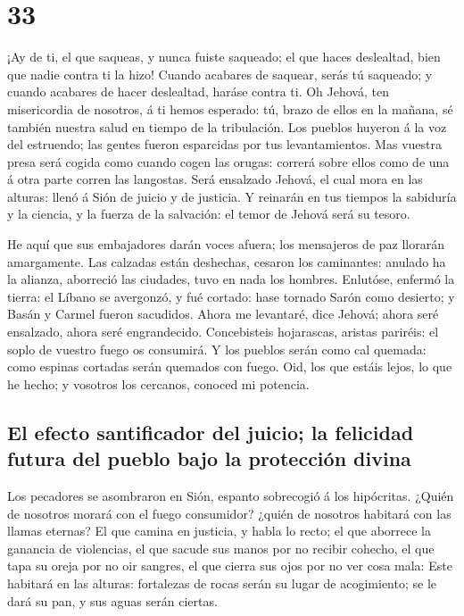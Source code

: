 \hypertarget{section-32}{%
\section{33}\label{section-32}}

 ¡Ay de ti, el que saqueas, y nunca fuiste saqueado; el que
haces deslealtad, bien que nadie contra ti la hizo! Cuando acabares de
saquear, serás tú saqueado; y cuando acabares de hacer deslealtad,
haráse contra ti.  Oh Jehová, ten misericordia de nosotros,
á ti hemos esperado: tú, brazo de ellos en la mañana, sé también nuestra
salud en tiempo de la tribulación.  Los pueblos huyeron á la
voz del estruendo; las gentes fueron esparcidas por tus levantamientos.
 Mas vuestra presa será cogida como cuando cogen las orugas:
correrá sobre ellos como de una á otra parte corren las langostas.
 Será ensalzado Jehová, el cual mora en las alturas: llenó á
Sión de juicio y de justicia.  Y reinarán en tus tiempos la
sabiduría y la ciencia, y la fuerza de la salvación: el temor de Jehová
será su tesoro.

 He aquí que sus embajadores darán voces afuera; los
mensajeros de paz llorarán amargamente.  Las calzadas están
deshechas, cesaron los caminantes: anulado ha la alianza, aborreció las
ciudades, tuvo en nada los hombres.  Enlutóse, enfermó la
tierra: el Líbano se avergonzó, y fué cortado: hase tornado Sarón como
desierto; y Basán y Carmel fueron sacudidos.  Ahora me
levantaré, dice Jehová; ahora seré ensalzado, ahora seré engrandecido.
 Concebisteis hojarascas, aristas pariréis: el soplo de
vuestro fuego os consumirá.  Y los pueblos serán como cal
quemada: como espinas cortadas serán quemados con fuego. 
Oid, los que estáis lejos, lo que he hecho; y vosotros los cercanos,
conoced mi potencia.

\hypertarget{el-efecto-santificador-del-juicio-la-felicidad-futura-del-pueblo-bajo-la-protecciuxf3n-divina}{%
\subsection{El efecto santificador del juicio; la felicidad futura del
pueblo bajo la protección
divina}\label{el-efecto-santificador-del-juicio-la-felicidad-futura-del-pueblo-bajo-la-protecciuxf3n-divina}}

 Los pecadores se asombraron en Sión, espanto sobrecogió á
los hipócritas. ¿Quién de nosotros morará con el fuego consumidor?
¿quién de nosotros habitará con las llamas eternas?  El que
camina en justicia, y habla lo recto; el que aborrece la ganancia de
violencias, el que sacude sus manos por no recibir cohecho, el que tapa
su oreja por no oir sangres, el que cierra sus ojos por no ver cosa
mala:  Este habitará en las alturas: fortalezas de rocas
serán su lugar de acogimiento; se le dará su pan, y sus aguas serán
ciertas.


